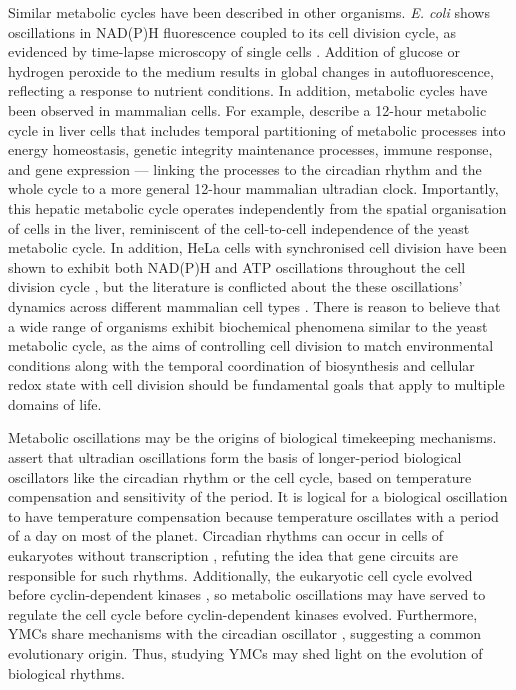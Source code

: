 Similar metabolic cycles have been described in other organisms.
\textit{E. coli} shows oscillations in NAD(P)H fluorescence coupled to its cell division cycle, as evidenced by time-lapse microscopy of single cells \parencite{zhangDynamicSinglecellNAD2018}.
Addition of glucose or hydrogen peroxide to the medium results in global changes in autofluorescence, reflecting a response to nutrient conditions.
In addition, metabolic cycles have been observed in mammalian cells.
For example, \textcite{zhuLogicTemporalCompartmentalization2022} describe a 12-hour metabolic cycle in liver cells that includes temporal partitioning of metabolic processes into energy homeostasis, genetic integrity maintenance processes, immune response, and gene expression --- linking the processes to the circadian rhythm and the whole cycle to a more general 12-hour mammalian ultradian clock.
Importantly, this hepatic metabolic cycle operates independently from the spatial organisation of cells in the liver, reminiscent of the cell-to-cell independence of the yeast metabolic cycle.
In addition, HeLa cells with synchronised cell division have been shown to exhibit both NAD(P)H and ATP oscillations throughout the cell division cycle \parencite{ahnTemporalFluxomicsReveals2017}, but the literature is conflicted about the these oscillations' dynamics across different mammalian cell types \parencite{zylstraMetabolicDynamicsCell2022}.
There is reason to believe that a wide range of organisms exhibit biochemical phenomena similar to the yeast metabolic cycle, as the aims of controlling cell division to match environmental conditions along with the temporal coordination of biosynthesis and cellular redox state with cell division should be fundamental goals that apply to multiple domains of life.

Metabolic oscillations may be the origins of biological timekeeping mechanisms.
\textcite{lloydRedoxRhythmicityClocks2007} assert that ultradian oscillations form the basis of longer-period biological oscillators like the circadian rhythm or the cell cycle, based on temperature compensation and sensitivity of the period.
It is logical for a biological oscillation to have temperature compensation because temperature oscillates with a period of a day on most of the planet.
Circadian rhythms can occur in cells of eukaryotes without transcription \parencite{oneillCircadianRhythmsPersist2011,oneillCircadianClocksHuman2011}, refuting the idea that gene circuits are responsible for such rhythms.
Additionally, the eukaryotic cell cycle evolved before cyclin-dependent kinases \parencite{papagiannakisAutonomousMetabolicOscillations2017}, so metabolic oscillations may have served to regulate the cell cycle before cyclin-dependent kinases evolved.
Furthermore, YMCs share mechanisms with the circadian oscillator \parencite{caustonMetabolicCyclesYeast2015,arataQuantitativeStudiesCellDivision2019}, suggesting a common evolutionary origin.
Thus, studying YMCs may shed light on the evolution of biological rhythms.

